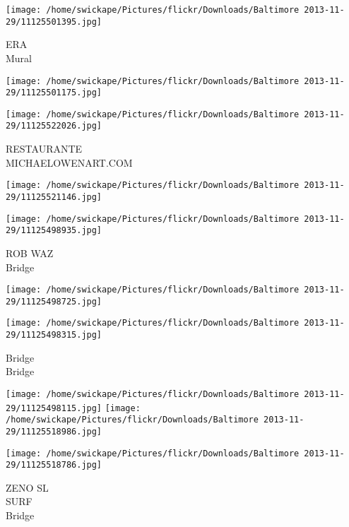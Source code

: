 \documentclass[10pt,letterpaper]{article}
\begin{document}
\vspace{0.25in}
\texttt{[image: /home/swickape/Pictures/flickr/Downloads/Baltimore 2013-11-29/11125501395.jpg]}

ERA\\
Mural\\
\pagebreak

\texttt{[image: /home/swickape/Pictures/flickr/Downloads/Baltimore 2013-11-29/11125501175.jpg]}

\vspace{0.25in}
\texttt{[image: /home/swickape/Pictures/flickr/Downloads/Baltimore 2013-11-29/11125522026.jpg]}

RESTAURANTE\\
MICHAELOWENART.COM\\
\pagebreak

\texttt{[image: /home/swickape/Pictures/flickr/Downloads/Baltimore 2013-11-29/11125521146.jpg]}

\vspace{0.25in}
\texttt{[image: /home/swickape/Pictures/flickr/Downloads/Baltimore 2013-11-29/11125498935.jpg]}

ROB WAZ\\
Bridge\\
\pagebreak

\texttt{[image: /home/swickape/Pictures/flickr/Downloads/Baltimore 2013-11-29/11125498725.jpg]}

\vspace{0.25in}
\texttt{[image: /home/swickape/Pictures/flickr/Downloads/Baltimore 2013-11-29/11125498315.jpg]}

Bridge\\
Bridge\\
\pagebreak

\texttt{[image: /home/swickape/Pictures/flickr/Downloads/Baltimore 2013-11-29/11125498115.jpg]}
\texttt{[image: /home/swickape/Pictures/flickr/Downloads/Baltimore 2013-11-29/11125518986.jpg]}

\vspace{0.25in}
\texttt{[image: /home/swickape/Pictures/flickr/Downloads/Baltimore 2013-11-29/11125518786.jpg]}

ZENO SL\\
SURF\\
Bridge\\
\pagebreak
\end{document}
